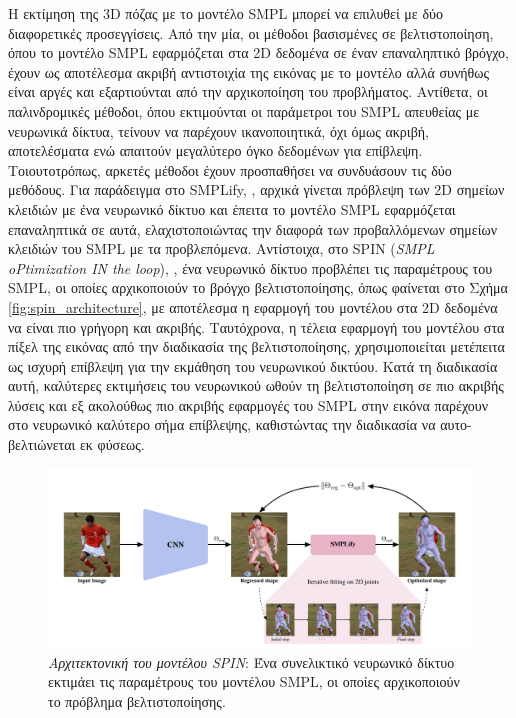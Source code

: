 Η εκτίμηση της 3D πόζας με το μοντέλο SMPL μπορεί να επιλυθεί με δύο διαφορετικές προσεγγίσεις. Από την μία, οι μέθοδοι βασισμένες σε βελτιστοποίηση, όπου το μοντέλο SMPL εφαρμόζεται στα 2D δεδομένα σε έναν επαναληπτικό βρόγχο, έχουν ως αποτέλεσμα ακριβή αντιστοιχία της εικόνας με το μοντέλο αλλά συνήθως είναι αργές και εξαρτιούνται από την αρχικοποίηση του προβλήματος. Αντίθετα, οι παλινδρομικές μέθοδοι, όπου εκτιμούνται οι παράμετροι του SMPL απευθείας με νευρωνικά δίκτυα, τείνουν να παρέχουν ικανοποιητικά, όχι όμως ακριβή, αποτελέσματα ενώ απαιτούν μεγαλύτερο όγκο δεδομένων για επίβλεψη. Τοιουτοτρόπως, αρκετές μέθοδοι έχουν προσπαθήσει να συνδυάσουν τις δύο μεθόδους. Για παράδειγμα στο SMPLify, \cite{keep_it_smpl_paper}, αρχικά γίνεται πρόβλεψη των 2D σημείων κλειδιών με ένα νευρωνικό δίκτυο και έπειτα το μοντέλο SMPL εφαρμόζεται επαναληπτικά σε αυτά, ελαχιστοποιώντας την διαφορά των προβαλλόμενων σημείων κλειδιών του SMPL με τα προβλεπόμενα. Αντίστοιχα, στο SPIN (\textsl{SMPL oPtimization IN the loop}), \cite{spin_paper}, ένα νευρωνικό δίκτυο προβλέπει τις παραμέτρους του SMPL, οι οποίες αρχικοποιούν το βρόγχο βελτιστοποίησης, όπως φαίνεται στο Σχήμα \ref{fig:spin_architecture}, με αποτέλεσμα η εφαρμογή του μοντέλου στα 2D δεδομένα να είναι πιο γρήγορη και ακριβής. Ταυτόχρονα, η τέλεια εφαρμογή του μοντέλου στα πίξελ της εικόνας από την διαδικασία της βελτιστοποίησης, χρησιμοποιείται μετέπειτα ως ισχυρή επίβλεψη για την εκμάθηση του νευρωνικού δικτύου. Κατά τη διαδικασία αυτή, καλύτερες εκτιμήσεις του νευρωνικού ωθούν τη βελτιστοποίηση σε πιο ακριβής λύσεις και εξ ακολούθως πιο ακριβής εφαρμογές του SMPL στην εικόνα παρέχουν στο νευρωνικό καλύτερο σήμα επίβλεψης, καθιστώντας την διαδικασία να αυτο-βελτιώνεται εκ φύσεως.

 \begin{figure}[h!]
	\centering
	\includegraphics[scale=0.4]{images/chapter2/3d_pose_estimation/spin_architecture.png}
	\caption[Αρχιτεκτονική του μοντέλου SPIN]{\textsl{Αρχιτεκτονική του μοντέλου SPIN}: Ένα συνελικτικό νευρωνικό δίκτυο εκτιμάει τις παραμέτρους του μοντέλου SMPL, οι οποίες αρχικοποιούν το πρόβλημα βελτιστοποίησης.}
	\label{fig:hmr_architecture}
\end{figure}


